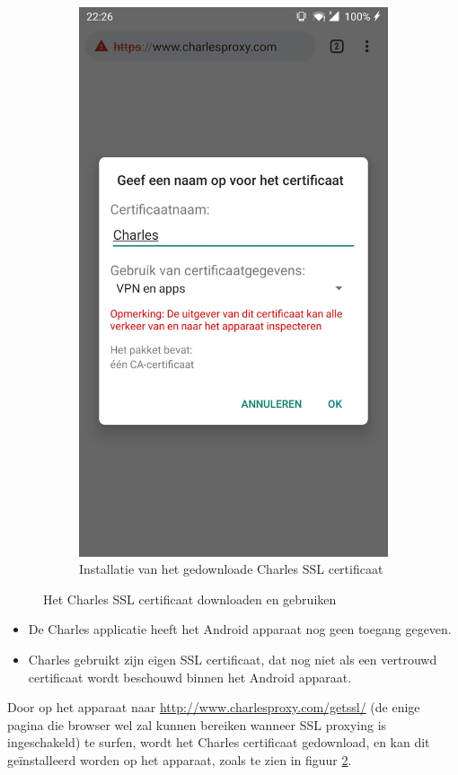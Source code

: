 \begin{figure}
\begin{subfigure}{.5\textwidth}
        \includegraphics[width=0.8\linewidth]{img/charlessslcertificateinstall.jpg}
        \caption{Installatie van het gedownloade Charles SSL certificaat}
        \label{fig:charlessslcertificateinstall}
    \end{subfigure}
    \caption{Het Charles SSL certificaat downloaden en gebruiken}
\end{figure}

\begin{itemize}
    \item De Charles applicatie heeft het Android apparaat nog geen toegang gegeven.
    \item Charles gebruikt zijn eigen SSL certificaat, dat nog niet als een vertrouwd certificaat wordt beschouwd binnen het Android apparaat.
\end{itemize}

Door op het apparaat naar \url{http://www.charlesproxy.com/getssl/} (de enige pagina die browser wel zal kunnen bereiken wanneer SSL proxying is ingeschakeld) te surfen, wordt het Charles certificaat gedownload, en kan dit geïnstalleerd worden op het apparaat, zoals te zien in figuur \ref{fig:charlessslcertificateinstall}.

